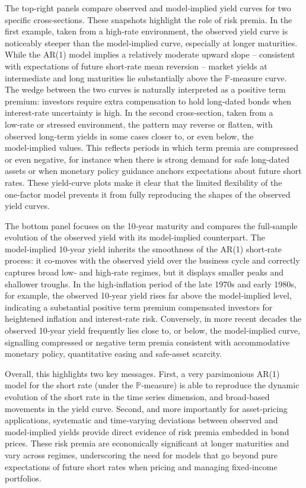 \documentclass[
  letterpaper,
  DIV=11,
  numbers=noendperiod]{scrreprt}
\begin{document}
The top‑right panels compare observed and model‑implied yield curves for
two specific cross‑sections. These snapshots highlight the role of risk
premia. In the first example, taken from a high‑rate environment, the
observed yield curve is noticeably steeper than the model‑implied curve,
especially at longer maturities. While the AR(1) model implies a
relatively moderate upward slope -- consistent with expectations of
future short‑rate mean reversion -- market yields at intermediate and
long maturities lie substantially above the \(\mathbb{P}\)‑measure
curve. The wedge between the two curves is naturally interpreted as a
positive term premium: investors require extra compensation to hold
long‑dated bonds when interest‑rate uncertainty is high. In the second
cross‑section, taken from a low‑rate or stressed environment, the
pattern may reverse or flatten, with observed long‑term yields in some
cases closer to, or even below, the model‑implied values. This reflects
periods in which term premia are compressed or even negative, for
instance when there is strong demand for safe long‑dated assets or when
monetary policy guidance anchors expectations about future short rates.
These yield-curve plots make it clear that the limited flexibility of
the one‑factor model prevents it from fully reproducing the shapes of
the observed yield curves.

The bottom panel focuses on the 10‑year maturity and compares the
full‑sample evolution of the observed yield with its model‑implied
counterpart. The model‑implied 10‑year yield inherits the smoothness of
the AR(1) short‑rate process: it co‑moves with the observed yield over
the business cycle and correctly captures broad low‑ and high‑rate
regimes, but it displays smaller peaks and shallower troughs. In the
high‑inflation period of the late 1970s and early 1980s, for example,
the observed 10‑year yield rises far above the model‑implied level,
indicating a substantial positive term premium compensated investors for
heightened inflation and interest‑rate risk. Conversely, in more recent
decades the observed 10‑year yield frequently lies close to, or below,
the model‑implied curve, signalling compressed or negative term premia
consistent with accommodative monetary policy, quantitative easing and
safe‑asset scarcity.

Overall, this highlights two key messages. First, a very parsimonious
AR(1) model for the short rate (under the \(\mathbb{P}\)‑measure) is
able to reproduce the dynamic evolution of the short rate in the time
series dimension, and broad-based movements in the yield curve. Second,
and more importantly for asset‑pricing applications, systematic and
time‑varying deviations between observed and model‑implied yields
provide direct evidence of risk premia embedded in bond prices. These
risk premia are economically significant at longer maturities and vary
across regimes, underscoring the need for models that go beyond pure
expectations of future short rates when pricing and managing
fixed‑income portfolios.
\end{document}
